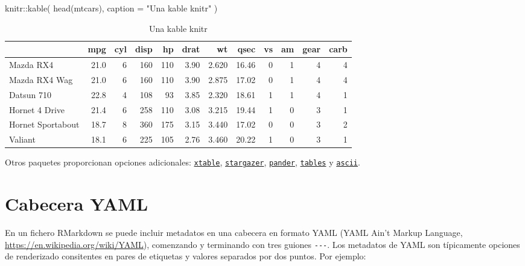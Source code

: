 \documentclass[
]{book}
\newenvironment{Shaded}{\begin{snugshade}}{\end{snugshade}}
\newcommand{\AttributeTok}[1]{\textcolor[rgb]{0.77,0.63,0.00}{#1}}
\newcommand{\FunctionTok}[1]{\textcolor[rgb]{0.00,0.00,0.00}{#1}}
\newcommand{\NormalTok}[1]{#1}
\newcommand{\SpecialCharTok}[1]{\textcolor[rgb]{0.00,0.00,0.00}{#1}}
\newcommand{\StringTok}[1]{\textcolor[rgb]{0.31,0.60,0.02}{#1}}
\theoremstyle{break}
\theoremstyle{nonumberplain}
\begin{document}
\begin{Shaded}
\begin{Highlighting}[]
\NormalTok{knitr}\SpecialCharTok{::}\FunctionTok{kable}\NormalTok{(}
  \FunctionTok{head}\NormalTok{(mtcars), }
  \AttributeTok{caption =} \StringTok{"Una kable knitr"}
\NormalTok{)}
\end{Highlighting}
\end{Shaded}

\begin{table}

\caption{\label{tab:kable}Una kable knitr}
\centering
\begin{tabular}[t]{l|r|r|r|r|r|r|r|r|r|r|r}
\hline
  & mpg & cyl & disp & hp & drat & wt & qsec & vs & am & gear & carb\\
\hline
Mazda RX4 & 21.0 & 6 & 160 & 110 & 3.90 & 2.620 & 16.46 & 0 & 1 & 4 & 4\\
\hline
Mazda RX4 Wag & 21.0 & 6 & 160 & 110 & 3.90 & 2.875 & 17.02 & 0 & 1 & 4 & 4\\
\hline
Datsun 710 & 22.8 & 4 & 108 & 93 & 3.85 & 2.320 & 18.61 & 1 & 1 & 4 & 1\\
\hline
Hornet 4 Drive & 21.4 & 6 & 258 & 110 & 3.08 & 3.215 & 19.44 & 1 & 0 & 3 & 1\\
\hline
Hornet Sportabout & 18.7 & 8 & 360 & 175 & 3.15 & 3.440 & 17.02 & 0 & 0 & 3 & 2\\
\hline
Valiant & 18.1 & 6 & 225 & 105 & 2.76 & 3.460 & 20.22 & 1 & 0 & 3 & 1\\
\hline
\end{tabular}
\end{table}

Otros paquetes proporcionan opciones adicionales: \href{http://xtable.r-forge.r-project.org/}{\texttt{xtable}}, \href{https://CRAN.R-project.org/package=stargazer}{\texttt{stargazer}}, \href{https://rapporter.github.io/pander/}{\texttt{pander}}, \href{https://r-forge.r-project.org/projects/tables/}{\texttt{tables}} y \href{https://github.com/mclements/ascii}{\texttt{ascii}}.

\hypertarget{yaml}{%
\section{Cabecera YAML}\label{yaml}}

En un fichero RMarkdown se puede incluir metadatos en una cabecera en formato YAML
(YAML Ain't Markup Language, \url{https://en.wikipedia.org/wiki/YAML}),
comenzando y terminando con tres guiones \texttt{-\/-\/-}.
Los metadatos de YAML son típicamente opciones de renderizado consitentes en
pares de etiquetas y valores separados por dos puntos.
Por ejemplo:
\end{document}
